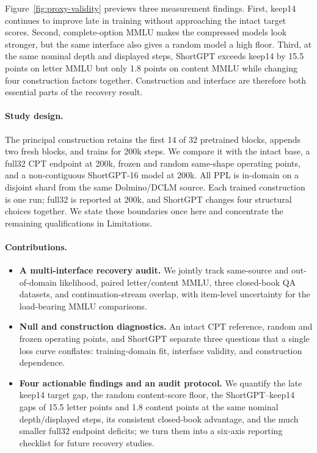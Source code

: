 Figure~\ref{fig:proxy-validity} previews three measurement findings. First,
keep14 continues to improve late in training without approaching the intact
target scores. Second, complete-option MMLU makes the compressed models look
stronger, but the same interface also gives a random model a high floor. Third,
at the same nominal depth and displayed steps, ShortGPT exceeds keep14 by
15.5 points on letter MMLU but only 1.8 points on content MMLU while changing
four construction factors together. Construction and interface are therefore
both essential parts of the recovery result.

\paragraph{Study design.}
The principal construction retains the first 14 of 32 pretrained blocks,
appends two fresh blocks, and trains for 200k steps. We compare it with the
intact base, a full32 CPT endpoint at 200k, frozen and random same-shape
operating points, and a non-contiguous ShortGPT-16 model at 200k. All PPL is
in-domain on a disjoint shard from the same Dolmino/DCLM source. Each trained
construction is one run; full32 is reported at 200k, and ShortGPT changes
four structural choices together. We state these boundaries once here and
concentrate the remaining qualifications in Limitations.

\paragraph{Contributions.}
\begin{itemize}[leftmargin=1.2em,itemsep=2pt]
\item \textbf{A multi-interface recovery audit.} We jointly track same-source
and out-of-domain likelihood, paired letter/content MMLU, three closed-book QA
datasets, and continuation-stream overlap, with item-level uncertainty for the
load-bearing MMLU comparisons.
\item \textbf{Null and construction diagnostics.} An intact CPT reference,
random and frozen operating points, and ShortGPT separate three questions that
a single loss curve conflates: training-domain fit, interface validity, and
construction dependence.
\item \textbf{Four actionable findings and an audit protocol.} We quantify the
late keep14 target gap, the random content-score floor, the
ShortGPT--keep14 gaps of 15.5 letter points and 1.8 content points at the same
nominal depth/displayed steps, its consistent closed-book advantage, and the
much smaller full32 endpoint deficits;
we turn them into a six-axis reporting checklist for future recovery studies.
\end{itemize}
